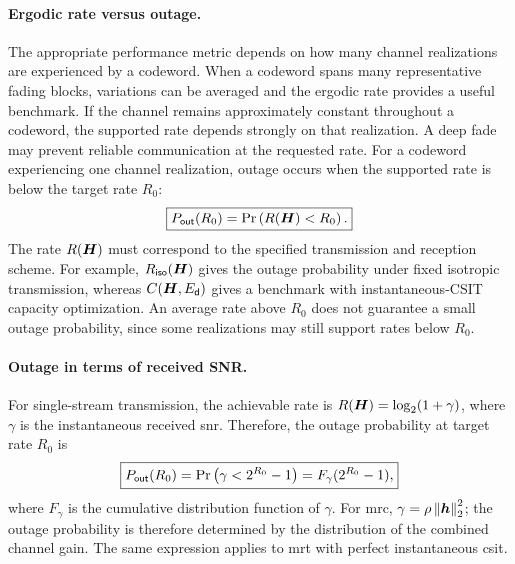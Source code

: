 \paragraph{Ergodic rate versus outage.}
The appropriate performance metric depends on how many channel realizations are experienced by a codeword.
%
When a codeword spans many representative fading blocks, variations can be averaged and the ergodic rate provides a useful benchmark. If the channel remains approximately constant throughout a codeword, the supported rate depends strongly on that realization. A deep fade may prevent reliable communication at the requested rate.
%
For a codeword experiencing one channel realization, outage occurs when the supported rate is below the target rate $R_0$:
\begin{equation}\label{eq:outage}
	\boxed{
		P_{\mathsf{out}}(R_0)
		=\Pr\left(R(\bm{H})<R_0\right).
	}
\end{equation}
The rate $R(\bm{H})$ must correspond to the specified transmission and reception scheme. For example, $R_{\mathsf{iso}}(\bm{H})$ gives the outage probability under fixed isotropic transmission, whereas $C(\bm{H},E_{\mathsf{d}})$ gives a benchmark with instantaneous-CSIT capacity optimization.
%
An average rate above $R_0$ does not guarantee a small outage probability, since some realizations may still support rates below $R_0$.


\paragraph{Outage in terms of received SNR.}
For single-stream transmission, the achievable rate is
$R(\bm{H})=\log_2(1+\gamma)$, where $\gamma$
is the instantaneous received \ac{snr}.
%
Therefore, the outage probability at target rate $R_0$ is
\begin{equation}\label{eq:snrout}
	\boxed{
		P_{\mathsf{out}}(R_0)
		=\Pr\left(\gamma<2^{R_0}-1\right)
		=F_\gamma(2^{R_0}-1),
	}
\end{equation}
where $F_\gamma$ is the cumulative distribution function of $\gamma$.
%
For \ac{mrc}, $\gamma=\rho\left\|\bm{h}\right\|_2^2$;
the outage probability is therefore determined by
the distribution of the combined channel gain.
The same expression applies to \ac{mrt} with
perfect instantaneous \ac{csit}.


